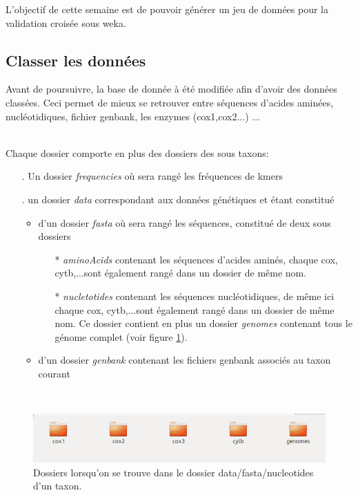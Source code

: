 L'objectif de cette semaine est de pouvoir générer un jeu de données pour la validation croisée sous weka.

\subsection{Classer les données}

Avant de poursuivre, la base de donnée à été modifiée afin d'avoir des données classées. Ceci permet de mieux se retrouver entre séquences d'acides aminées, nucléotidiques, fichier genbank, les enzymes (cox1,cox2...) ...

~\\
Chaque dossier comporte en plus des dossiers des sous taxons:

\begin{itemize}
 \item[.]Un dossier \textit{frequencies} où sera rangé les fréquences de kmers
  \item[.]un dossier \textit{data} correspondant aux données génétiques et étant constitué
  \begin{itemize}
 \item d'un dossier \textit{fasta} où sera rangé les séquences, constitué de deux sous dossiers 
  \begin{itemize}
 \item[*]\textit{aminoAcids} contenant les séquences d'acides aminés, chaque cox, cytb,...sont également rangé dans un dossier de même nom. 
 
  \item[*]\textit{nucletotides} contenant les séquences nucléotidiques, de même ici chaque cox, cytb,...sont également rangé dans un dossier de même nom. Ce dossier contient en plus un dossier \textit{genomes} contenant tous le génome complet (voir figure \ref{dossierCox}).
  
\end{itemize}
  \item d'un dossier \textit{genbank} contenant les fichiers genbank associés au taxon courant
  
\end{itemize}
\end{itemize}
~\\

\begin{figure}[H]
\begin{center}
\includegraphics[scale=0.5]{./../img/dossier.png}
\caption{\label{dossierCox} Dossiers lorsqu'on se trouve dans le dossier data/fasta/nucleotides d'un taxon.}
\end{center}
\end{figure}
~\\

